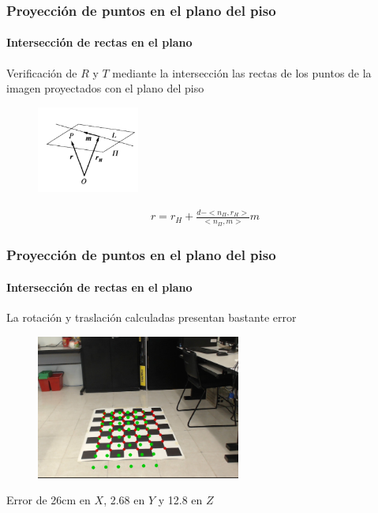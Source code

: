 \documentclass[10pt, compress]{beamer}
\begin{document}
\begin{frame}[fragile]
	\frametitle{Proyección de puntos en el plano del piso}
	\framesubtitle{Intersección de rectas en el plano}
Verificación de $R$ y $T$ mediante la intersección las rectas de los puntos de la imagen proyectados con el plano del piso
		\begin{figure}[htbp]
			\includegraphics[width=0.3\textwidth]{./pictures/intersec}
		\end{figure}
		\begin{eqnarray}
		r=r_H+\frac{d-<n_{\Pi}, r_H>}{<n_{\Pi},m>}m
		\end{eqnarray}
\end{frame}

\begin{frame}[fragile]
	\frametitle{Proyección de puntos en el plano del piso}
	\framesubtitle{Intersección de rectas en el plano}
	La rotación y traslación calculadas presentan bastante error
	\begin{figure}[htbp]
		\includegraphics[width=0.6\textwidth]{./pictures/rep}
	\end{figure}	
	Error de 26cm en $X$, 2.68 en $Y$ y 12.8 en $Z$
\end{frame}
\end{document}
